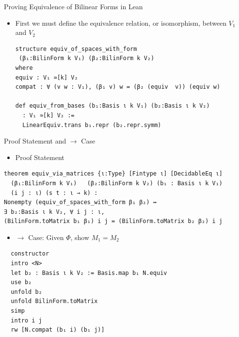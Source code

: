 \documentclass[svgnames]{beamer}
\begin{document}

\begin{frame}[label={sec:proof_comparison},fragile]{Proving Equivalence of Bilinear Forms in Lean}
\begin{itemize}
    \item First we must define the equivalence relation, or isomorphism, between $V_1$ and $V_2$
{\scriptsize
\begin{verbatim}
structure equiv_of_spaces_with_form
 (β₁:BilinForm k V₁) (β₂:BilinForm k V₂)
where
equiv : V₁ ≃[k] V₂
compat : ∀ (v w : V₁), (β₁ v) w = (β₂ (equiv  v)) (equiv w)

def equiv_from_bases (b₁:Basis ι k V₁) (b₂:Basis ι k V₂)
  : V₁ ≃[k] V₂ :=
  LinearEquiv.trans b₁.repr (b₂.repr.symm)
\end{verbatim}
}
\end{itemize}
\end{frame}

\begin{frame}[label={sec:proof_comparison},fragile]{Proof Statement and $\rightarrow$ Case}
\begin{itemize}
    \item Proof Statement
\end{itemize}
{\scriptsize
\begin{verbatim}
theorem equiv_via_matrices {ι:Type} [Fintype ι] [DecidableEq ι]
  (β₁:BilinForm k V₁)   (β₂:BilinForm k V₂) (b₁ : Basis ι k V₁) 
  (i j : ι) (s t : ι → k) : 
Nonempty (equiv_of_spaces_with_form β₁ β₂) ↔  
∃ b₂:Basis ι k V₂, ∀ i j : ι,
(BilinForm.toMatrix b₁ β₁) i j = (BilinForm.toMatrix b₂ β₂) i j
\end{verbatim}
}
\begin{itemize}
    \item $\rightarrow$ Case: Given $\Phi$, show $M_1 = M_2$
\end{itemize}
{\tiny
\begin{verbatim}
  constructor
  intro <N>
  let b₂ : Basis ι k V₂ := Basis.map b₁ N.equiv
  use b₂
  unfold b₂
  unfold BilinForm.toMatrix
  simp
  intro i j
  rw [N.compat (b₁ i) (b₁ j)]
\end{verbatim}
}
\end{frame}
\end{document}
